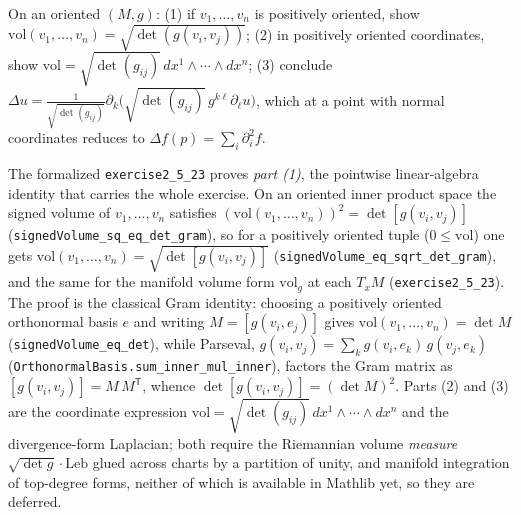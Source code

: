 \begin{remark}
  \label{rem:pet-ch2-ex-23}
  \leanok
  On an oriented $(M,g)$: (1) if $v_1,\dots,v_n$ is positively oriented, show
  $\mathrm{vol}(v_1,\dots,v_n)=\sqrt{\det(g(v_i,v_j))}$; (2) in positively
  oriented coordinates, show
  $\mathrm{vol}=\sqrt{\det(g_{ij})}\,dx^1\wedge\cdots\wedge dx^n$; (3) conclude
  $\Delta u=\frac1{\sqrt{\det(g_{ij})}}\partial_k\big(\sqrt{\det(g_{ij})}\,g^{k\ell}\partial_\ell u\big)$,
  which at a point with normal coordinates reduces to $\Delta f(p)=\sum_i\partial_i^2f$.

  The formalized \texttt{exercise2\_5\_23} proves \emph{part (1)}, the pointwise
  linear-algebra identity that carries the whole exercise. On an oriented inner
  product space the signed volume of $v_1,\dots,v_n$ satisfies
  $(\mathrm{vol}(v_1,\dots,v_n))^2=\det[g(v_i,v_j)]$
  (\texttt{signedVolume\_sq\_eq\_det\_gram}), so for a positively oriented tuple
  ($0\le\mathrm{vol}$) one gets $\mathrm{vol}(v_1,\dots,v_n)=\sqrt{\det[g(v_i,v_j)]}$
  (\texttt{signedVolume\_eq\_sqrt\_det\_gram}), and the same for the manifold volume
  form $\mathrm{vol}_g$ at each $T_xM$ (\texttt{exercise2\_5\_23}). The proof is the
  classical Gram identity: choosing a positively oriented orthonormal basis $e$ and
  writing $M=[g(v_i,e_j)]$ gives $\mathrm{vol}(v_1,\dots,v_n)=\det M$
  (\texttt{signedVolume\_eq\_det}), while Parseval,
  $g(v_i,v_j)=\sum_k g(v_i,e_k)\,g(v_j,e_k)$
  (\texttt{OrthonormalBasis.sum\_inner\_mul\_inner}), factors the Gram matrix as
  $[g(v_i,v_j)]=M\,M^{\mathsf T}$, whence $\det[g(v_i,v_j)]=(\det M)^2$. Parts (2)
  and (3) are the coordinate expression $\mathrm{vol}=\sqrt{\det(g_{ij})}\,dx^1\wedge
  \cdots\wedge dx^n$ and the divergence-form Laplacian; both require the Riemannian
  volume \emph{measure} $\sqrt{\det g}\cdot\mathrm{Leb}$ glued across charts by a
  partition of unity, and manifold integration of top-degree forms, neither of which
  is available in Mathlib yet, so they are deferred.
\end{remark}

